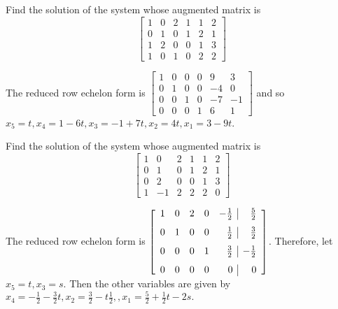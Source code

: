 \documentclass{ximera}
\begin{document}
\begin{problem}\label{prb:2.28} Find the solution of the system whose augmented matrix is
\begin{equation*}
\left[
\begin{array}{rrrrr|r}
1 & 0 & 2 & 1 & 1 & 2 \\
0 & 1 & 0 & 1 & 2 & 1 \\
1 & 2 & 0 & 0 & 1 & 3 \\
1 & 0 & 1 & 0 & 2 & 2
\end{array}
\right]
\end{equation*}
\begin{hint}
The reduced row echelon form is $\left[
\begin{array}{rrrrr|r}
1 & 0 & 0 & 0 & 9 & 3 \\
0 & 1 & 0 & 0 & -4 & 0 \\
0 & 0 & 1 & 0 & -7 & -1 \\
0 & 0 & 0 & 1 & 6 & 1
\end{array}
\right] $ and so $x_{5}=t,x_{4}=1-6t,x_{3}=-1+7t,x_{2}=4t,x_{1}=3-9t$.
\end{hint}
\end{problem}

\begin{problem}\label{prb:2.29} Find the solution of the system whose augmented matrix is
\begin{equation*}
\left[
\begin{array}{rrrrr|r}
1 & 0 & 2 & 1 & 1 & 2 \\
0 & 1 & 0 & 1 & 2 & 1 \\
0 & 2 & 0 & 0 & 1 & 3 \\
1 & -1 & 2 & 2 & 2 & 0
\end{array}
\right]
\end{equation*}
\begin{hint}
The reduced row echelon form is $\left[
\begin{array}{rrrrr|r}
1 & 0 & 2 & 0 & -\vspace{0.05in}\frac{1}{2} & \vspace{0.05in}\frac{5}{2} \\
0 & 1 & 0 & 0 & \vspace{0.05in}\frac{1}{2} & \vspace{0.05in}\frac{3}{2} \\
0 & 0 & 0 & 1 & \vspace{0.05in}\frac{3}{2} & -\vspace{0.05in}\frac{1}{2} \\
0 & 0 & 0 & 0 & 0 & 0
\end{array}
\right] $. Therefore, let $x_{5}=t,x_{3}=s.$ Then the other variables are
given by $x_{4}=-\frac{1}{2}-\frac{3}{2}t,x_{2}=\frac{3}{2}-t\frac{1}{2}
,,x_{1}=\frac{5}{2}+\frac{1}{2}t-2s.$
\end{hint}
\end{problem}
\end{document}
